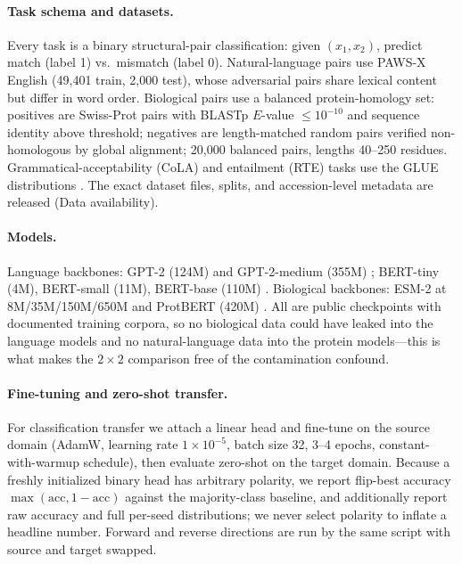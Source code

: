 \documentclass[11pt]{article}
\begin{document}
\paragraph{Task schema and datasets.} Every task is a binary structural-pair classification:
given $(x_1, x_2)$, predict match (label 1) vs.\ mismatch (label 0). Natural-language pairs use
PAWS-X English \cite{yang2019paws} (49{,}401 train, 2{,}000 test), whose adversarial pairs share
lexical content but differ in word order. Biological pairs use a balanced protein-homology set:
positives are Swiss-Prot pairs with BLASTp $E$-value $\le 10^{-10}$ and sequence identity above
threshold; negatives are length-matched random pairs verified non-homologous by global alignment;
20{,}000 balanced pairs, lengths 40--250 residues. Grammatical-acceptability (CoLA) and entailment
(RTE) tasks use the GLUE distributions \cite{wang2019glue}. The exact dataset files, splits, and
accession-level metadata are released (Data availability).

\paragraph{Models.} Language backbones: GPT-2 (124M) and GPT-2-medium (355M) \cite{radford2019gpt2};
BERT-tiny (4M), BERT-small (11M), BERT-base (110M) \cite{devlin2019bert}. Biological backbones:
ESM-2 at 8M/35M/150M/650M \cite{lin2023} and ProtBERT (420M) \cite{brandes2022proteinbert}. All are
public checkpoints with documented training corpora, so no biological data could have leaked into
the language models and no natural-language data into the protein models---this is what makes the
$2{\times}2$ comparison free of the contamination confound.

\paragraph{Fine-tuning and zero-shot transfer.} For classification transfer we attach a linear head
and fine-tune on the source domain (AdamW, learning rate $1\times10^{-5}$, batch size 32, 3--4
epochs, constant-with-warmup schedule), then evaluate zero-shot on the target domain. Because a
freshly initialized binary head has arbitrary polarity, we report flip-best accuracy
$\max(\mathrm{acc}, 1-\mathrm{acc})$ against the majority-class baseline, and additionally report
raw accuracy and full per-seed distributions; we never select polarity to inflate a headline
number. Forward and reverse directions are run by the same script with source and target swapped.
\end{document}
